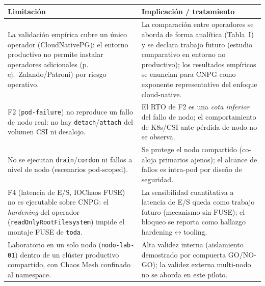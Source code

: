 \begin{tabular}{p{}p{}}
\toprule
Limitación & Implicación / tratamiento \\
\midrule
La validación empírica cubre un único operador (CloudNativePG): el entorno productivo no permite instalar operadores adicionales (p.\,ej.\ Zalando/Patroni) por riesgo operativo. & La comparación entre operadores se aborda de forma analítica (Tabla~I) y se declara trabajo futuro (estudio comparativo en entorno no productivo); los resultados empíricos se enuncian para CNPG como exponente representativo del enfoque cloud-native. \\
\addlinespace
F2 (\texttt{pod-failure}) no reproduce un fallo de nodo real: no hay \texttt{detach}/\texttt{attach} del volumen CSI ni desalojo. & El RTO de F2 es una \emph{cota inferior} del fallo de nodo; el comportamiento de K8s/CSI ante pérdida de nodo no se observa. \\
\addlinespace
No se ejecutan \texttt{drain}/\texttt{cordon} ni fallos a nivel de nodo (escenarios pod-scoped). & Se protege el nodo compartido (co-aloja primarios ajenos); el alcance de fallos es intra-pod por diseño de seguridad. \\
\addlinespace
F4 (latencia de E/S, IOChaos FUSE) no es ejecutable sobre CNPG: el \emph{hardening} del operador (\texttt{readOnlyRootFilesystem}) impide el montaje FUSE de \texttt{toda}. & La sensibilidad cuantitativa a latencia de E/S queda como trabajo futuro (mecanismo sin FUSE); el bloqueo se reporta como hallazgo hardening$\leftrightarrow$tooling. \\
\addlinespace
Laboratorio en un solo nodo (\texttt{nodo-lab-01}) dentro de un clúster productivo compartido, con Chaos Mesh confinado al namespace. & Alta validez interna (aislamiento demostrado por compuerta GO/NO-GO); la validez externa multi-nodo no se aborda en este piloto. \\
\bottomrule
\end{tabular}
